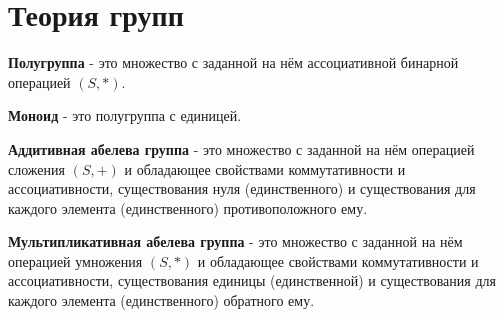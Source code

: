 \section{Теория групп}
\textbf{Полугруппа} - это множество с заданной на нём ассоциативной бинарной операцией $(S, *)$.

\textbf{Моноид} - это полугруппа с единицей.

\textbf{Аддитивная абелева группа} - это множество с заданной на нём операцией сложения $(S, +)$ и обладающее свойствами коммутативности и ассоциативности, существования нуля (единственного) и существования для каждого элемента (единственного) противоположного ему.

\textbf{Мультипликативная абелева группа} - это множество с заданной на нём операцией умножения $(S, *)$ и обладающее свойствами коммутативности и ассоциативности, существования единицы (единственной) и существования для каждого элемента (единственного) обратного ему.


